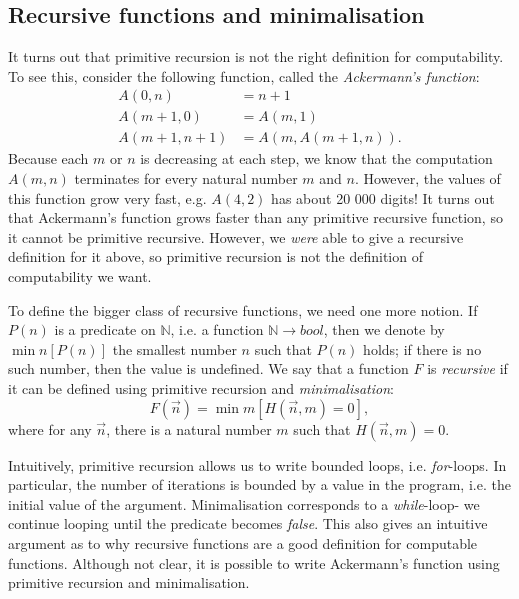 \documentclass[a4paper, openany]{memoir}
\theoremstyle{definition}
\begin{document}
    \subsection{Recursive functions and minimalisation}
    It turns out that primitive recursion is not the right definition for computability. To see this, consider the following function, called the \emph{Ackermann's function}:
    \begin{align*}
        A(0, n) &= n + 1 \\
        A(m + 1, 0) &= A(m, 1) \\
        A(m+1, n+1) &= A(m, A(m+1, n)).
    \end{align*}
    Because each $m$ or $n$ is decreasing at each step, we know that the computation $A(m, n)$ terminates for every natural number $m$ and $n$. However, the values of this function grow very fast, e.g. $A(4, 2)$ has about 20 000 digits! It turns out that Ackermann's function grows faster than any primitive recursive function, so it cannot be primitive recursive. However, we \emph{were} able to give a recursive definition for it above, so primitive recursion is not the definition of computability we want.

    To define the bigger class of recursive functions, we need one more notion. If $P(n)$ is a predicate on $\mathbb{N}$, i.e. a function $\mathbb{N} \to bool$, then we denote by $\min n[P(n)]$ the smallest number $n$ such that $P(n)$ holds; if there is no such number, then the value is undefined. We say that a function $F$ is \emph{recursive} if it can be defined using primitive recursion and \emph{minimalisation}:
    \[F(\vec{n}) = \min m[H(\vec{n}, m) = 0],\]
    where for any $\vec{n}$, there is a natural number $m$ such that $H(\vec{n}, m) = 0$.

    Intuitively, primitive recursion allows us to write bounded loops, i.e. \textit{for}-loops. In particular, the number of iterations is bounded by a value in the program, i.e. the initial value of the argument. Minimalisation corresponds to a \textit{while}-loop- we continue looping until the predicate becomes \textit{false}. This also gives an intuitive argument as to why recursive functions are a good definition for computable functions. Although not clear, it is possible to write Ackermann's function using primitive recursion and minimalisation.
\end{document}
